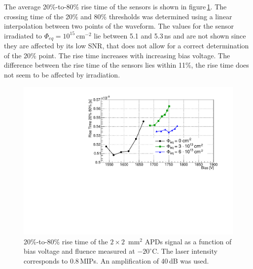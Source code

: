 \documentclass{article}
\begin{document}
The average 20\%-to-80\% rise time of the sensors is shown in figure\,\ref{fig:riseTime2x2}.
The crossing time of the 20\% and 80\% thresholds was determined using a linear interpolation between two points of the waveform.
The values for the sensor irradiated to $\Phi_{eq} = 10^{15}$\,cm$^{-2}$ lie between 5.1 and 5.3\,ns and are not shown since they are affected by its low SNR, that does not allow for a correct determination of the 20\% point.
The rise time increases with increasing bias voltage.
The difference between the rise time of the sensors lies within 11\%, the rise time does not seem to be affected by irradiation.

\begin{figure}
  \centering
  \includegraphics[width = 0.6 \textwidth]{riseTime2x2APDsNo1e15}
  \caption{20\%-to-80\% rise time of the $2 \times 2$~mm$^2$ APDs signal as a function of bias voltage and fluence measured at $-20^\circ$C. The laser intensity corresponds to 0.8\,MIPs. An amplification of 40\,dB was used.}
  \label{fig:riseTime2x2}
\end{figure}
\end{document}
